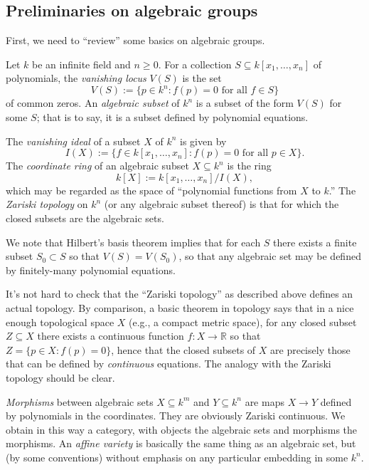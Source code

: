 \documentclass[reqno]{amsart} 
\begin{document}
\subsection{Preliminaries on algebraic groups}\label{sec:cnh2vouaz0}
First, we need to ``review'' some basics on algebraic groups.
\begin{definition}
  Let $k$ be an infinite field and $n \geq 0$.  For a collection $S \subseteq k[x_1,\dotsc,x_n]$ of polynomials, the \emph{vanishing locus} $V(S)$ is the set
  \begin{equation*}
    V(S) := \{p \in k^n : f(p) = 0 \text{ for all } f \in S\}
  \end{equation*}
  of common zeros.  An \emph{algebraic subset} of $k^n$ is a subset of the form $V(S)$ for some $S$; that is to say, it is a subset defined by polynomial equations.

  The \emph{vanishing ideal} of a subset $X$ of $k^n$ is given by
  \begin{equation*}
    I(X) := \{f \in k[x_1,\dotsc,x_n] : f(p) = 0 \text{ for all } p \in X\}.
  \end{equation*}
  The \emph{coordinate ring} of an algebraic subset $X \subseteq k^n$ is the ring
  \begin{equation*}
k[X] := k[x_1,\dotsc,x_n]/I(X),
\end{equation*}
 which may be regarded as the space of ``polynomial functions from $X$ to $k$.''  The \emph{Zariski topology} on $k^n$ (or any algebraic subset thereof) is that for which the closed subsets are the algebraic sets.
\end{definition}

We note that Hilbert's basis theorem implies that for each $S$ there exists a finite subset $S_0 \subset S$ so that $V(S) = V(S_0)$, so that any algebraic set may be defined by finitely-many polynomial equations.

It's not hard to check that the ``Zariski topology'' as described above defines an actual topology.  By comparison, a basic theorem in topology says that in a nice enough topological space $X$ (e.g., a compact metric space), for any closed subset $Z \subseteq X$ there exists a continuous function $f : X \rightarrow \mathbb{R}$ so that $Z = \{p \in X : f(p) = 0 \}$, hence that the closed subsets of $X$ are precisely those that can be defined by \emph{continuous} equations.  The analogy with the Zariski topology should be clear.

\emph{Morphisms} between algebraic sets $X \subseteq k^m$ and $Y \subseteq k^n$ are maps $X \rightarrow Y$ defined by polynomials in the coordinates.  They are obviously Zariski continuous.  We obtain in this way a category, with objects the algebraic sets and morphisms the morphisms.  An \emph{affine variety} is basically the same thing as an algebraic set, but (by some conventions) without emphasis on any particular embedding in some $k^n$.
\end{document}

